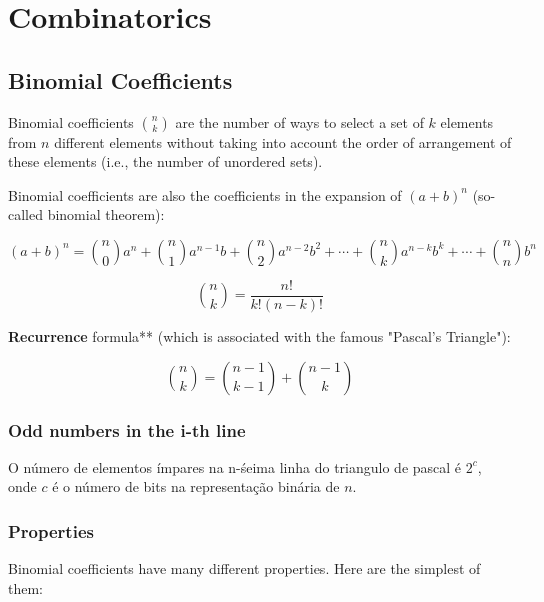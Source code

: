 \section{Combinatorics}

\subsection{Binomial Coefficients}

Binomial coefficients $\binom n k$ are the number of ways to select a set of $k$ elements from $n$ different elements without taking into account the order of arrangement of these elements (i.e., the number of unordered sets).

Binomial coefficients are also the coefficients in the expansion of $(a + b) ^ n$ (so-called binomial theorem):

$$ (a+b)^n = \binom n 0 a^n + \binom n 1 a^{n-1} b + \binom n 2 a^{n-2} b^2 + \cdots + \binom n k a^{n-k} b^k + \cdots + \binom n n b^n $$

$$ \binom n k = \frac {n!} {k!(n-k)!} $$

\textbf{Recurrence} formula** (which is associated with the famous "Pascal's Triangle"):

$$ \binom n k = \binom {n-1} {k-1} + \binom {n-1} k $$

\subsubsection{Odd numbers in the i-th line}

O número de elementos ímpares na n-śeima linha do triangulo de pascal é $2^{c}$, onde $c$ é o número de bits
na representação binária de $n$.

\subsubsection{Properties}

Binomial coefficients have many different properties. Here are the simplest of them:


